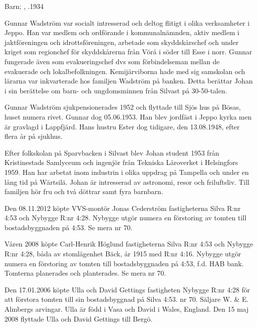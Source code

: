 Barn;	, .1934

Gunnar Wadström var socialt intresserad och deltog flitigt i olika verksamheter i Jeppo. Han var medlem och	ordförande 	i kommunalnämnden, aktiv medlem i jaktföreningen och idrottsföreningen, arbetade som skyddskårschef och under kriget som regionchef för skyddskårerna från Vörå i söder till Esse i norr. Gunnar fungerade även som evakueringschef dvs som förbindelseman mellan de evakuerade och lokalbefolkningen. Kemijärviborna hade med sig samskolan och lärarna var inkvarterade hos familjen Wadström på banken. Detta berättar Johan i sin berättelse om barn- och ungdomsminnen från Silvast på 30-50-talen.

Gunnar Wadström sjukpensionerades 1952 och flyttade till Sjös hus på Bösas, huset numera rivet. Gunnar dog 05.06.1953. Han blev jordfäst i Jeppo kyrka men är gravlagd i Lappfjärd. Hans hustru Ester dog tidigare, den 13.08.1948, efter flera år på sjukhus.

Efter folkskolan på Sparvbacken i Silvast blev Johan student 1953 från Kristinestads Samlyceum och ingenjör från Tekniska Läroverket i Helsingfors 1959. Han har arbetat inom industrin i olika uppdrag på Tampella och under en lång tid på Wärtsilä. Johan är intresserad av astronomi,	resor och friluftsliv. Till familjen hör fru och två döttrar samt fyra barnbarn.





Den 08.11.2012 köpte VVS-montör Jonas Cederström fastigheterna Silva R:nr 4:53 och Nybygge R:nr 4:28. Nybygge utgör numera en förstoring av tomten till bostadsbyggnaden på 4:53. Se mera nr 70.


Våren 2008 köpte Carl-Henrik Höglund fastigheterna Silva R:nr 4:53 och Nybygge R:nr 4:28, båda av stomlägenhet Bäck, år 1915 med R:nr 4:16. Nybygge utgör numera en förstoring av tomten till bostadsbyggnaden på 4:53, f.d. HAB bank. Tomterna planerades och planterades. Se mera nr 70.


Den 17.01.2006 köpte Ulla och David Gettings fastigheten Nybygge R:nr 4:28 för att förstora tomten till sin		bostadsbyggnad på Silva 4:53. nr 70. Säljare W. \& E. Almbergs arvingar. Ulla är född i Vasa och David i Wales, England. Den 15 maj 2008 flyttade Ulla och David Gettings till Bergö.


